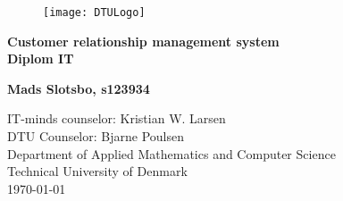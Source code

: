 


	\frontmatter
	\begin{figure}[t!]
        \hspace{8cm} 
        \texttt{[image: DTULogo]}
    \end{figure}

	\thispagestyle{empty} %
    \hspace{6cm} \vspace{0cm}
    \begin{center}
    \textbf{\Huge {Customer relationship management system}\\ \vspace{1cm}
    \huge{Diplom IT}}
    \end{center}
    \vspace{3cm}
    \begin{center}
    \Large{\textbf{Mads Slotsbo, s123934}}
    \end{center}
    \vspace{4.0cm}
    IT-minds counselor: Kristian W. Larsen\\
    DTU Counselor: Bjarne Poulsen\\
    Department of Applied Mathematics and Computer Science\\
    Technical University of Denmark\\
    \today
	
    

	\listoftodos {}
    
	\tableofcontents										%
    \listoffigures											%
	\mainmatter

	
	
	
	

	\backmatter
    \printbibliography

